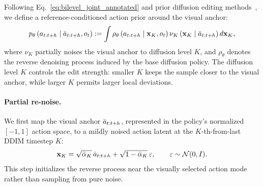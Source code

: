 Following Eq.~\ref{eq:bilevel_joint_annotated} and prior diffusion editing
methods~\cite{meng2021sdedit}, we define a reference-conditioned action prior
around the visual anchor:
\begin{equation}
p_\theta
\left(
    a_{t:t+h}
    \mid
    \bar{a}_{t:t+h}, o_t
\right)
:=
\int
\rho_\theta
\left(
    a_{t:t+h}
    \mid
    \mathbf{x}_{K}, o_t
\right)
\nu_K
\left(
    \mathbf{x}_{K}
    \mid
    \bar{a}_{t:t+h}
\right)
d\mathbf{x}_{K},
\label{eq:reference_conditioned_prior}
\end{equation}
where $\nu_K$ partially noises the visual anchor to diffusion level $K$, and
$\rho_\theta$ denotes the reverse denoising process induced by the base diffusion
policy. The diffusion level $K$ controls the edit strength: smaller $K$ keeps the
sample closer to the visual anchor, while larger $K$ permits larger local
deviations.

\paragraph{Partial re-noise.}
We first map the visual anchor $\bar{a}_{t:t+h}$, represented in the
policy's normalized $[-1,1]$ action space, to a mildly noised action latent at the
$K$-th-from-last DDIM timestep $K$:
\begin{equation}
\mathbf{x}_{K}
=
\sqrt{\bar\alpha_{K}}\,
\bar{a}_{t:t+h}
+
\sqrt{1-\bar\alpha_{K}}\,
\varepsilon,
\qquad
\varepsilon \sim \mathcal{N}(0,I).
\label{eq:renoise}
\end{equation}
This step initializes the reverse process near the visually selected action mode
rather than sampling from pure noise.

